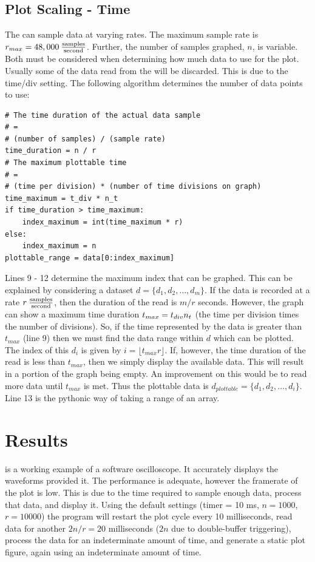 \documentclass[12pt,reqno]{amsart}
\begin{document}
\subsection{Plot Scaling - Time}
The \device{} can sample data at varying rates. The maximum sample rate\nidaq{} is $r_{max} = 48,000 \:\frac{\textrm{samples}}{\textrm{second}}$. Further, the number of samples graphed, $n$, is variable. Both must be considered when determining how much data to use for the plot. Usually some of the data read from the \device{} will be discarded. This is due to the time/div setting. The following algorithm determines the number of data points to use:
\begin{verbatim}
# The time duration of the actual data sample 
# = 
# (number of samples) / (sample rate)
time_duration = n / r
# The maximum plottable time 
# =
# (time per division) * (number of time divisions on graph)
time_maximum = t_div * n_t
if time_duration > time_maximum:
    index_maximum = int(time_maximum * r)
else:
    index_maximum = n
plottable_range = data[0:index_maximum]
\end{verbatim}
Lines 9 - 12 determine the maximum index that can be graphed. This can be explained by considering a dataset $d = \{d_1, d_2, \dots, d_m\}$. If the data is recorded at a rate $r \:\frac{\textrm{samples}}{\textrm{second}}$, then the duration of the read is $m / r$ seconds. However, the graph can show a maximum time duration $t_{max} = t_{div} n_t$ (the time per division times the number of divisions). So, if the time represented by the data is greater than $t_{max}$ (line 9) then we must find the data range within $d$ which can be plotted. The index of this $d_i$ is given by $i = \lfloor t_{max} r \rfloor$. If, however, the time duration of the read is less than $t_{max}$, then we simply display the available data. This will result in a portion of the graph being empty. An improvement on this would be to read more data until $t_{max}$ is met. Thus the plottable data is $d_{plottable} = \{d_1, d_2, \dots, d_i\}$. Line 13 is the pythonic way of taking a range of an array.

\section{Results}
\progname{} is a working example of a software oscilloscope. It accurately displays the waveforms provided it. The performance is adequate, however the framerate of the plot is low. This is due to the time required to sample enough data, process that data, and display it. Using the default settings (timer = 10 ms, $n = 1000$, $r = 10000$) the program will restart the plot cycle every 10 milliseconds, read data for another $2n / r = 20$ milliseconds ($2n$ due to double-buffer triggering), process the data for an indeterminate amount of time, and generate a static plot figure, again using an indeterminate amount of time.
\end{document}
